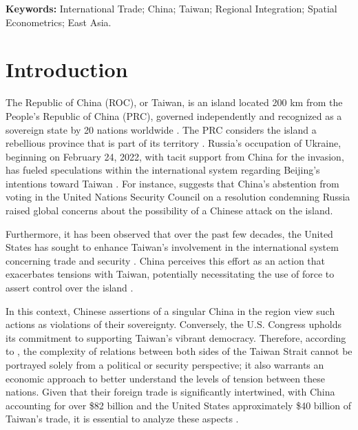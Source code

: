 \documentclass{article}
\begin{document}
\vspace{0.5cm}
\noindent\textbf{Keywords:} International Trade; China; Taiwan; Regional Integration; Spatial Econometrics; East Asia.

\section{Introduction}

The Republic of China (ROC), or Taiwan, is an island located 200 km from the People's Republic of China (PRC), governed independently and recognized as a sovereign state by 20 nations worldwide \citep{barbosa_who_cares_about_taiwan}. The PRC considers the island a rebellious province that is part of its territory \citep{vladimir_ivanov_rebel_island_china_taiwan_question}. Russia's occupation of Ukraine, beginning on February 24, 2022, with tacit support from China for the invasion, has fueled speculations within the international system regarding Beijing's intentions toward Taiwan \citep{yeung_what_you_need_to_know_china_taiwan_tensions}. For instance, \citet{tadeu_brazil_vote_resolution} suggests that China's abstention from voting in the United Nations Security Council on a resolution condemning Russia raised global concerns about the possibility of a Chinese attack on the island.

Furthermore, it has been observed that over the past few decades, the United States has sought to enhance Taiwan's involvement in the international system concerning trade and security \citep{wenzhao_taiwan_policy_obama_administration}. China perceives this effort as an action that exacerbates tensions with Taiwan, potentially necessitating the use of force to assert control over the island \citep{hernandez_china_suspends_diplomatic_contact, trent_chinas_views_of_regional_security}.

In this context, Chinese assertions of a singular China in the region view such actions as violations of their sovereignty. Conversely, the U.S. Congress upholds its commitment to supporting Taiwan's vibrant democracy. Therefore, according to \citet{hsu_cross_strait_peace_development}, the complexity of relations between both sides of the Taiwan Strait cannot be portrayed solely from a political or security perspective; it also warrants an economic approach to better understand the levels of tension between these nations. Given that their foreign trade is significantly intertwined, with China accounting for over \$82 billion and the United States approximately \$40 billion of Taiwan's trade, it is essential to analyze these aspects \citep{ma_trade_balance_china_taiwan}.
\end{document}
